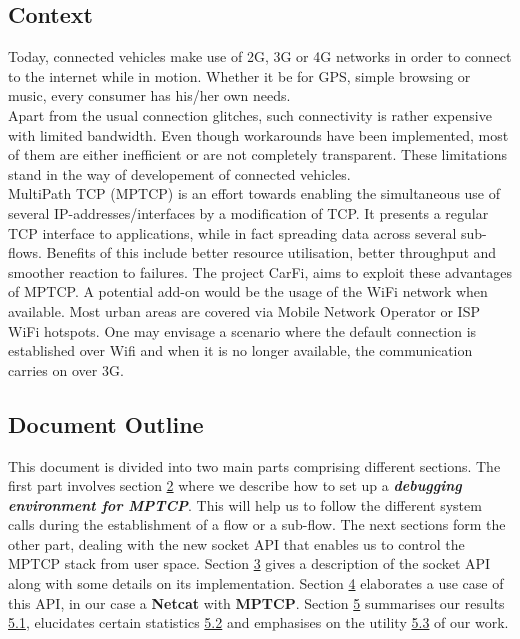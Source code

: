 \documentclass[a4paper,11pt]{article}
\begin{document}
		\subsection{Context}
			\begin{description}
				\item \hspace{2cm} Today, connected vehicles make use of 2G, 3G or 4G networks in order to connect to the internet while in motion. Whether it be for GPS, simple browsing or music, every consumer has his/her own needs. \\Apart from the usual connection glitches, such connectivity is rather expensive with limited bandwidth. Even though workarounds have been implemented, most of them are either inefficient or are not completely transparent. These limitations stand in the way of developement of connected vehicles. \\MultiPath TCP (MPTCP) is an effort towards enabling the simultaneous use of several IP-addresses/interfaces by a modification of TCP. It presents a regular TCP interface to applications, while in fact spreading data across several sub-flows. Benefits of this include better resource utilisation, better throughput and smoother reaction to failures. The project CarFi, aims to exploit these advantages of MPTCP. A potential add-on would be the usage of the WiFi network when available. Most urban areas are covered via Mobile Network Operator or ISP WiFi hotspots. One may envisage a scenario where the default connection is established over Wifi and when it is no longer available, the communication carries on over 3G.
			\end{description}
	
		\vspace{0.5cm}
		\subsection{Document Outline}
			\begin{description}
				\item \hspace{2cm} This document is divided into two main parts comprising different sections. The first part involves section \hyperref[sec:mptcpdebug]{2} where we describe how to set up a \textbf{\emph{debugging environment for MPTCP}}. This will help us to follow the different system calls during the establishment of a flow or a sub-flow. The next sections form the other part, dealing with the new socket API that enables us to control the MPTCP stack from user space. Section \hyperref[sec:mptcpapi]{3} gives a description of the socket API along with some details on its implementation. Section \hyperref[sec:netcat-mptcp]{4} elaborates a use case of this API, in our case a \textbf{Netcat} with \textbf{MPTCP}. Section \hyperref[sec:res]{5} summarises our results \hyperref[subsec:result]{5.1}, elucidates certain statistics \hyperref[subsec:statistics]{5.2} and emphasises on the utility \hyperref[subsec:utility]{5.3} of our work.
			\end{description}
\end{document}
